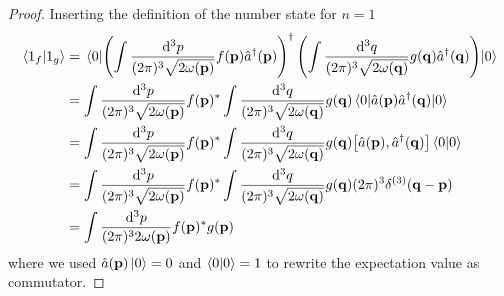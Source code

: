 \qkgnumbersingleinner
\begin{proof}
	Inserting the definition of the number state for $n=1$
	\begin{equation*}
		\begin{split}
			\braket{1_f}{1_g}
			&=
			\expval{
				\left(
					\int\frac{\dd[3]{p}}{(2\pi)^3\sqrt{2\omega(\vb{p})}}
					f(\vb{p})
					\hat{a}^\dagger(\vb{p})
				\right)^\dagger
				\left(
					\int\frac{\dd[3]{q}}{(2\pi)^3\sqrt{2\omega(\vb{q})}}
					g(\vb{q})
					\hat{a}^\dagger(\vb{q})
				\right)
			}{0}
			\\
			&=
			\int\frac{\dd[3]{p}}{(2\pi)^3\sqrt{2\omega(\vb{p})}}
			f(\vb{p})^*
			\int\frac{\dd[3]{q}}{(2\pi)^3\sqrt{2\omega(\vb{q})}}
			g(\vb{q})
			\expval{\hat{a}(\vb{p})\hat{a}^\dagger(\vb{q})}{0}
			\\
			&=
			\int\frac{\dd[3]{p}}{(2\pi)^3\sqrt{2\omega(\vb{p})}}
			f(\vb{p})^*
			\int\frac{\dd[3]{q}}{(2\pi)^3\sqrt{2\omega(\vb{q})}}
			g(\vb{q})
			\comm{\hat{a}(\vb{p})}{\hat{a}^\dagger(\vb{q})}
			\braket{0}
			\\
			&=
			\int\frac{\dd[3]{p}}{(2\pi)^3\sqrt{2\omega(\vb{p})}}
			f(\vb{p})^*
			\int\frac{\dd[3]{q}}{(2\pi)^3\sqrt{2\omega(\vb{q})}}
			g(\vb{q})
			(2\pi)^3\delta^{(3)}(\vb{q}-\vb{p})
			\\
			&=
			\int\frac{\dd[3]{p}}{(2\pi)^32\omega(\vb{p})}
			f(\vb{p})^*
			g(\vb{p})
		\end{split}
	\end{equation*}
	where we used $\hat{a}(\vb{p})\ket{0}=0$ and $\braket{0}=1$ to rewrite the expectation value as commutator.
\end{proof}

